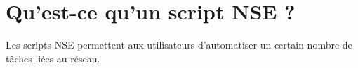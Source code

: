 \section{Qu’est-ce qu’un script NSE ?}

Les scripts NSE permettent aux utilisateurs d'automatiser un certain nombre de tâches liées au réseau.